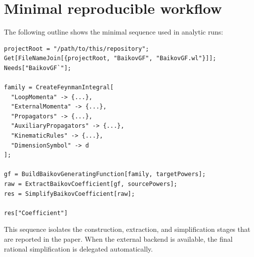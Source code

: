 \section*{Minimal reproducible workflow}
The following outline shows the minimal sequence used in analytic runs:
\begin{verbatim}
projectRoot = "/path/to/this/repository";
Get[FileNameJoin[{projectRoot, "BaikovGF", "BaikovGF.wl"}]];
Needs["BaikovGF`"];

family = CreateFeynmanIntegral[
  "LoopMomenta" -> {...},
  "ExternalMomenta" -> {...},
  "Propagators" -> {...},
  "AuxiliaryPropagators" -> {...},
  "KinematicRules" -> {...},
  "DimensionSymbol" -> d
];

gf = BuildBaikovGeneratingFunction[family, targetPowers];
raw = ExtractBaikovCoefficient[gf, sourcePowers];
res = SimplifyBaikovCoefficient[raw];

res["Coefficient"]
\end{verbatim}

This sequence isolates the construction, extraction, and simplification stages
that are reported in the paper. When the external backend is available, the
final rational simplification is delegated automatically.
